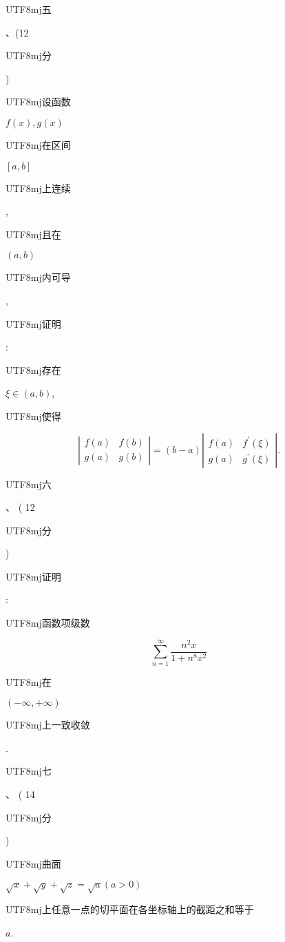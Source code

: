 \documentclass[10pt]{article}
\begin{document}
\begin{CJK}{UTF8}{mj}五\end{CJK}、(12 \begin{CJK}{UTF8}{mj}分\end{CJK}) \begin{CJK}{UTF8}{mj}设函数\end{CJK} $f(x), g(x)$ \begin{CJK}{UTF8}{mj}在区间\end{CJK} $[a, b]$ \begin{CJK}{UTF8}{mj}上连续\end{CJK}, \begin{CJK}{UTF8}{mj}且在\end{CJK} $(a, b)$ \begin{CJK}{UTF8}{mj}内可导\end{CJK}, \begin{CJK}{UTF8}{mj}证明\end{CJK}: \begin{CJK}{UTF8}{mj}存在\end{CJK} $\xi \in(a, b)$, \begin{CJK}{UTF8}{mj}使得\end{CJK}
$$
\left|\begin{array}{ll}
f(a) & f(b) \\
g(a) & g(b)
\end{array}\right|=(b-a)\left|\begin{array}{cc}
f(a) & f^{\prime}(\xi) \\
g(a) & g^{\prime}(\xi)
\end{array}\right| .
$$
\begin{CJK}{UTF8}{mj}六\end{CJK}、 ( 12 \begin{CJK}{UTF8}{mj}分\end{CJK}) \begin{CJK}{UTF8}{mj}证明\end{CJK}: \begin{CJK}{UTF8}{mj}函数项级数\end{CJK}
$$
\sum_{n=1}^{\infty} \frac{n^{2} x}{1+n^{8} x^{2}}
$$
\begin{CJK}{UTF8}{mj}在\end{CJK} $(-\infty,+\infty)$ \begin{CJK}{UTF8}{mj}上一致收敛\end{CJK}.

\begin{CJK}{UTF8}{mj}七\end{CJK}、 ( 14 \begin{CJK}{UTF8}{mj}分\end{CJK}) \begin{CJK}{UTF8}{mj}曲面\end{CJK} $\sqrt{x}+\sqrt{y}+\sqrt{z}=\sqrt{a}(a>0)$ \begin{CJK}{UTF8}{mj}上任意一点的切平面在各坐标轴上的截距之和等于\end{CJK} $a$.
\end{document}

